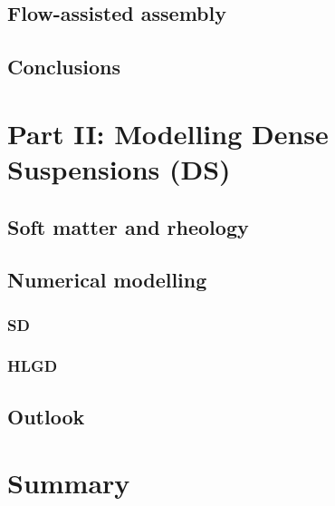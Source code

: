 

\hypertarget{assembly}{%
  \subsection{Flow-assisted assembly}}

\hypertarget{conclusion1}{%
  \subsection{Conclusions}}

\hypertarget{part2}{%
  \section{Part II: Modelling Dense Suspensions (DS)}}

\hypertarget{background2}{%
  \subsection{Soft matter and rheology}}

\hypertarget{simulation2}{%
  \subsection{Numerical modelling}}

\hypertarget{sd}{%
  \subsubsection{SD}}

\hypertarget{hlgd}{%
  \subsubsection{HLGD}}

\hypertarget{conclusion2}{%
  \subsection{Outlook}}

\hypertarget{summary}{%
  \section{Summary}}

